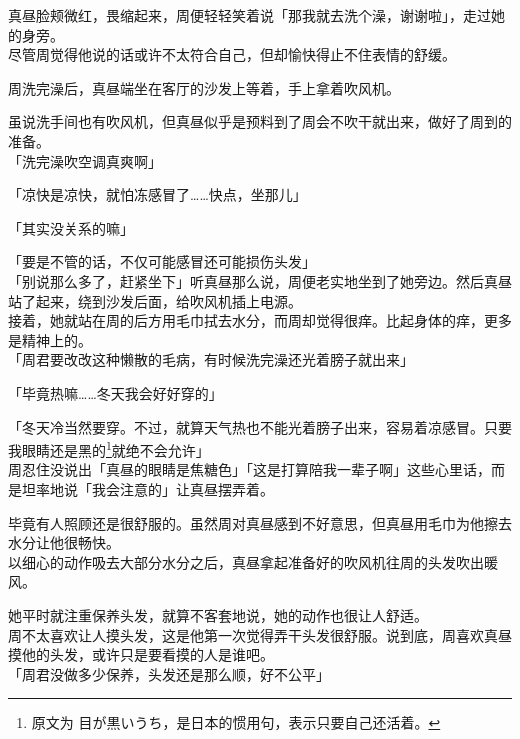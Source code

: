 真昼脸颊微红，畏缩起来，周便轻轻笑着说「那我就去洗个澡，谢谢啦」，走过她的身旁。\\

尽管周觉得他说的话或许不太符合自己，但却愉快得止不住表情的舒缓。\\

\vspace{2\baselineskip}

周洗完澡后，真昼端坐在客厅的沙发上等着，手上拿着吹风机。

虽说洗手间也有吹风机，但真昼似乎是预料到了周会不吹干就出来，做好了周到的准备。\\

「洗完澡吹空调真爽啊」

「凉快是凉快，就怕冻感冒了……快点，坐那儿」

「其实没关系的嘛」

「要是不管的话，不仅可能感冒还可能损伤头发」\\

「别说那么多了，赶紧坐下」听真昼那么说，周便老实地坐到了她旁边。然后真昼站了起来，绕到沙发后面，给吹风机插上电源。\\

接着，她就站在周的后方用毛巾拭去水分，而周却觉得很痒。比起身体的痒，更多是精神上的。\\

「周君要改改这种懒散的毛病，有时候洗完澡还光着膀子就出来」

「毕竟热嘛……冬天我会好好穿的」

「冬天冷当然要穿。不过，就算天气热也不能光着膀子出来，容易着凉感冒。只要我眼睛还是黑的\footnote{原文为 {\jpfont 目が黒いうち}，是日本的惯用句，表示只要自己还活着。}就绝不会允许」\\

周忍住没说出「真昼的眼睛是焦糖色」「这是打算陪我一辈子啊」这些心里话，而是坦率地说「我会注意的」让真昼摆弄着。

毕竟有人照顾还是很舒服的。虽然周对真昼感到不好意思，但真昼用毛巾为他擦去水分让他很畅快。\\

以细心的动作吸去大部分水分之后，真昼拿起准备好的吹风机往周的头发吹出暖风。

她平时就注重保养头发，就算不客套地说，她的动作也很让人舒适。\\

周不太喜欢让人摸头发，这是他第一次觉得弄干头发很舒服。说到底，周喜欢真昼摸他的头发，或许只是要看摸的人是谁吧。\\

「周君没做多少保养，头发还是那么顺，好不公平」\\

